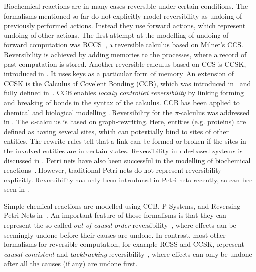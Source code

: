 Biochemical reactions are in many cases reversible under certain conditions. The formalisms mentioned so far do not explicitly model reversibility as undoing of previously performed actions. Instead they use forward actions, which represent undoing of other actions.
The first attempt at the modelling of undoing of forward computation was RCCS~\cite{10.1007/978-3-540-28644-8_19}, a reversible calculus based on Milner's CCS. Reversibility is achieved by adding memories to the processes, where a record of past computation is stored. Another reversible calculus based on CCS is CCSK, introduced in \cite{PhillipsUlidowski06,PHILLIPS200770}. It uses keys as a particular form of memory. An extension of CCSK is the Calculus of Covelent Bonding (CCB), which was introduced in~\cite{KU16} and fully defined in~\cite{KU2017}. CCB enables \textit{locally controlled reversibility} by linking forming and breaking of bonds in the syntax of the calculus. CCB has been applied to chemical and biological modelling \cite{10.1007/978-3-319-99498-7_8, Kuhn2020ReversibilityIC}. Reversibility for the $\pi$-calculus was addressed in \cite{10.1007/978-3-642-15375-4_33}. The $\kappa$-calculus \cite{DANOS200469} is based on graph-rewriting. Here, entities (e.g. proteins) are defined as having several sites, which can potentially bind to sites of other entities. The rewrite rules tell that a link can be formed or broken if the sites in the involved entities are in certain states. Reversibility in rule-based systems is discussed in \cite{Aman2020}. 
Petri nets have also been successful in the modelling of biochemical reactions~\cite{10.1007/978-3-540-68894-5_7}. However, traditional Petri nets do not represent reversibility explicitly. Reversibility has only been introduced in Petri nets recently, as can bee seen in \cite{DBLP:conf/rc/PhilippouP18,DBLP:conf/apn/BarylskaGMPPP18,MelgrattiMU20,MelgrattiMPPU20,DBLP:journals/corr/abs-2010-04000}. 


Simple chemical reactions are modelled using CCB, P Systems, and Reversing Petri Nets in~\cite{Kuhn2020ReversibilityIC}. 
An important feature of those formalisms is that they can represent the so-called \emph{out-of-causal order} reversibility~\cite{Irek2012}, where effects can be seemingly undone before their causes are undone.
In contrast, most other formalisms for reversible computation, for example RCSS and CCSK, represent \emph{causal-consistent} and \emph{backtracking} reversibility~\cite{DK2007,LPU2020}, where effects can only be undone after all the causes (if any) are undone first.
